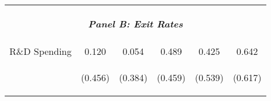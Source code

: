 \begin{tabular}{lccccc}
    \vspace{-2pt} & \vspace{-2pt} & \vspace{-2pt} & \vspace{-2pt} & \vspace{-2pt} \\
    \vspace{-1.5pt} & \vspace{-1.5pt} & \vspace{-1.5pt} & \vspace{-1.5pt} & \vspace{-1.5pt} \\
    \cmidrule{1-6}
    \vspace{-1.5pt} & \vspace{-1.5pt} & \vspace{-1.5pt} & \vspace{-1.5pt} & \vspace{-1.5pt} \\
    \multicolumn{6}{c}{\textit{\textbf{Panel B: Exit Rates}}} \\ 
    \vspace{-1.5pt} & \vspace{-1.5pt} & \vspace{-1.5pt} & \vspace{-1.5pt} & \vspace{-1.5pt} \\ 
    \vspace{-2pt} & \vspace{-2pt} & \vspace{-2pt} & \vspace{-2pt} & \vspace{-2pt} \\\hline
    \vspace{-1.5pt} & \vspace{-1.5pt} & \vspace{-1.5pt} & \vspace{-1.5pt} & \vspace{-1.5pt} \\
    R\&D Spending & 0.120 & 0.054 & 0.489 & 0.425 & 0.642 \\
    \vspace{4pt} & \begin{footnotesize}(0.456)\end{footnotesize} & \begin{footnotesize}(0.384)\end{footnotesize} & \begin{footnotesize}(0.459)\end{footnotesize} & \begin{footnotesize}(0.539)\end{footnotesize} & \begin{footnotesize}(0.617)\end{footnotesize} \\

\end{tabular}
